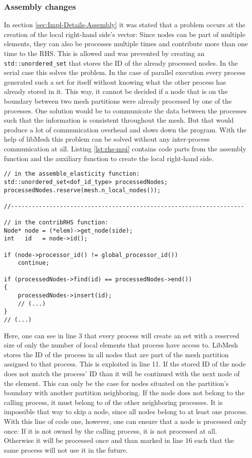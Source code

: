   
  
  \subsubsection{Assembly changes}
   In section \ref{sec:Impl-Details-Assembly} it was stated that a problem occurs at the creation of the local right-hand side's vector: Since nodes can be part of multiple elements, they can also be processes multiple times and contribute more than one time to the RHS. This is allowed and was prevented by creating an \texttt{std::unordered\_set} that stores the ID of the already processed nodes. In the serial case this solves the problem. In the case of parallel execution every process generated such a set for itself without knowing what the other process has already stored in it. This way, it cannot be decided if a node that is on the boundary between two mesh partitions were already processed by one of the processes. One solution would be to communicate the data between the processes such that the information is consistent throughout the mesh. But that would produce a lot of communication overhead and slows down the program. With the help of libMesh this problem can be solved without any inter-process communication at all. Listing \ref{lst:rhs-mpi} contains code parts from the assembly function and the auxiliary function to create the local right-hand side.
\begin{lstlisting}[caption=Process local nodes only,label=lst:rhs-mpi,keepspaces=true]
// in the assemble_elasticity function:
std::unordered_set<dof_id_type> processedNodes;
processedNodes.reserve(mesh.n_local_nodes());

//-------------------------------------------------------------------

// in the contribRHS function:
Node* node = (*elem)->get_node(side);
int   id   = node->id();

if (node->processor_id() != global_processor_id())
	continue;
	
if (processedNodes->find(id) == processedNodes->end())
{
	processedNodes->insert(id);
	// (...)
}
// (...)
\end{lstlisting}
   Here, one can see in line 3 that every process will create an set with a reserved size of only the number of local elements that process have access to. LibMesh stores the ID of the process in all nodes that are part of the mesh partition assigned to that process. This is exploited in line 11. If the stored ID of the node does not match the process' ID than it will be continued with the next node of the element. This can only be the case for nodes situated on the partition's boundary with another partition neighboring. If the node does not belong to the calling process, it must belong to of the other neighboring processes. It is impossible that way to skip a node, since all nodes belong to at least one process. With this line of code one, however, one can ensure that a node is processed only once: If it is not owned by the calling process, it is not processed at all. Otherwise it will be processed once and than marked in line 16 such that the same process will not use it in the future.